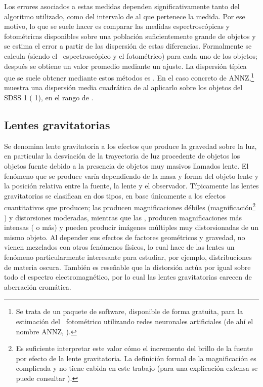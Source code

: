 Los errores asociados a estas medidas dependen significativamente tanto del algoritmo utilizado, como del intervalo de  al que pertenece la medida. Por ese motivo, lo que se suele hacer es comparar las medidas espectroscópicas y fotométricas disponibles sobre una población suficientemente grande de objetos y se estima el error a partir de las dispersión de estas diferencias. Formalmente se calcula  (siendo  el \rt\ espectroscópico y  el fotométrico) para cada uno de los objetos; después se obtiene un valor promedio mediante un ajuste. La dispersión típica que se suele obtener mediante estos métodos es  \citep{tesis:robert_juncosa}. En el caso concreto de ANNZ,\footnote{ Se trata de un paquete de software, disponible de forma gratuita, para la estimación del \rt\ fotométrico utilizando redes neuronales artificiales (de ahí el nombre ANNZ, ).} muestra una dispersión media cuadrática de  al aplicarlo sobre los objetos del SDSS 1 ( 1), en el rango de  \citep{article:annz}.

\subsection{Lentes gravitatorias}

Se denomina lente gravitatoria a los efectos que produce la gravedad sobre la luz, en particular la desviación de la trayectoria de luz procedente de objetos los objetos fuente debido a la presencia de objetos muy masivos llamados lente.
El fenómeno que se produce varía dependiendo de la masa y forma del objeto lente y la posición relativa entre la fuente, la lente y el observador. Típicamente las lentes gravitatorias se clasifican en dos tipos, en base únicamente a los efectos cuantitativos que producen; las  producen magnificaciones débiles (magnificación\footnote{Es suficiente interpretar este valor cómo el incremento del brillo de la fuente por efecto de la lente gravitatoria. La definición formal de la magnificación es complicada y no tiene cabida en este trabajo (para una explicación extensa se puede consultar \citealt{book:encyclopedia}).} ) y distorsiones moderadas, mientras que las , producen magnificaciones más intensas ( o más) y pueden producir imágenes múltiples muy distorsionadas de un mismo objeto. Al depender sus efectos de factores geométricos y gravedad, no vienen mezclados con otros fenómenos físicos, lo cual hace de las lentes un fenómeno particularmente interesante para estudiar, por ejemplo, distribuciones de materia oscura.
También es reseñable que la distorsión actúa  por igual sobre todo el espectro electromagnético, por lo cual las lentes gravitatorias carecen de aberración cromática.

